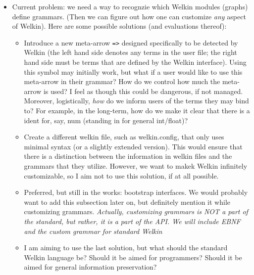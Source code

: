 \begin{itemize}
	\item Current problem: we need a way to recognzie which Welkin modules (graphs) define grammars. (Then we can figure out how one can customize \textit{any} aspect of Welkin). Here are some possible solutions (and evaluations thereof):
				\begin{itemize}
					\item Introduce a new meta-arrow \texttt{=>} designed specifically to be detected by Welkin (the left hand side denotes any terms in the user file; the right hand side must be terms that are defined by the Welkin interface). Using this symbol may initially work, but what if a user would like to use this meta-arrow in their grammar? How do we control how much the meta-arrow is used? I feel as though this could be dangerous, if not managed. Moreover, logistically, \textit{how} do we inform users of the terms they may bind to? For example, in the long-term, how do we make it clear that there is a ident for, say, num (standing in for general int/float)?
					\item Create a different welkin file, such as welkin.config, that only uses minimal syntax (or a slightly extended version). This would ensure that there is a distinction between the information in welkin files and the grammars that they utilize. However, we want to makek Welkin infinitely customizable, so I aim not to use this solution, if at all possible.
					\item Preferred, but still in the works: bootstrap interfaces. We would probably want to add this subsection later on, but definitely mention it while customizing grammars. \textit{Actually, customizing grammars is NOT a part of the standard, but rather, it is a part of the API. We will include EBNF and the custom grammar for standard Welkin}
				  \item I am aiming to use the last solution, but what should the standard Welkin language be? Should it be aimed for programmers? Should it be aimed for general information preservation?
				\end{itemize}
\end{itemize}


